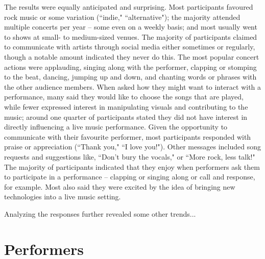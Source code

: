 The results were equally anticipated and surprising. Most participants favoured rock music or some variation (``indie," ``alternative"); the majority attended multiple concerts per year -- some even on a weekly basis; and most usually went to shows at small- to medium-sized venues. The majority of participants claimed to communicate with artists through social media either sometimes or regularly, though a notable amount indicated they never do this. The most popular concert actions were applauding, singing along with the performer, clapping or stomping to the beat, dancing, jumping up and down, and chanting words or phrases with the other audience members. When asked how they might want to interact with a performance, many said they would like to choose the songs that are played, while fewer expressed interest in manipulating visuals and contributing to the music; around one quarter of participants stated they did not have interest in directly influencing a live music performance. Given the opportunity to communicate with their favourite performer, most participants responded with praise or appreciation (``Thank you," ``I love you!"). Other messages included song requests and suggestions like, ``Don't bury the vocals," or ``More rock, less talk!" The majority of participants indicated that they enjoy when performers ask them to participate in a performance -- clapping or singing along or call and response, for example. Most also said they were excited by the idea of bringing new technologies into a live music setting.

Analyzing the responses further revealed some other trends... 

\section{Performers}